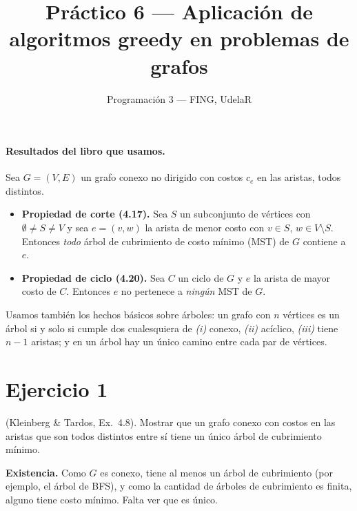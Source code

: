 

\title{Práctico 6 --- Aplicación de algoritmos greedy en problemas de grafos}
\author{Programación 3 --- FING, UdelaR}
\date{}


\maketitle

\paragraph{Resultados del libro que usamos.} Sea $G=(V,E)$ un grafo conexo no dirigido con costos $c_e$ en las aristas, todos distintos.
\begin{itemize}
\item \textbf{Propiedad de corte (4.17).} Sea $S$ un subconjunto de vértices con $\emptyset\neq S\neq V$ y sea $e=(v,w)$ la arista de menor costo con $v\in S$, $w\in V\setminus S$. Entonces \emph{todo} árbol de cubrimiento de costo mínimo (MST) de $G$ contiene a $e$.
\item \textbf{Propiedad de ciclo (4.20).} Sea $C$ un ciclo de $G$ y $e$ la arista de mayor costo de $C$. Entonces $e$ no pertenece a \emph{ningún} MST de $G$.
\end{itemize}
Usamos también los hechos básicos sobre árboles: un grafo con $n$ vértices es un árbol si y solo si cumple dos cualesquiera de \emph{(i)} conexo, \emph{(ii)} acíclico, \emph{(iii)} tiene $n-1$ aristas; y en un árbol hay un único camino entre cada par de vértices.

\section{Ejercicio 1}
\begin{enunciado}
(Kleinberg \& Tardos, Ex.~4.8). Mostrar que un grafo conexo con costos en las aristas que son todos distintos entre sí tiene un único árbol de cubrimiento mínimo.
\end{enunciado}


\textbf{Existencia.} Como $G$ es conexo, tiene al menos un árbol de cubrimiento (por ejemplo, el árbol de BFS), y como la cantidad de árboles de cubrimiento es finita, alguno tiene costo mínimo. Falta ver que es único.

